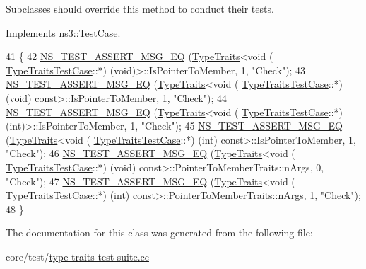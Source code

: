 Subclasses should override this method to conduct their tests. 

Implements \hyperlink{classns3_1_1TestCase_a8ff74680cf017ed42011e4be51917a24}{ns3\+::\+Test\+Case}.


\begin{DoxyCode}
41 \{
42   \hyperlink{group__testing_ga2a9d78cffb3db8e867c35fff0b698cf5}{NS\_TEST\_ASSERT\_MSG\_EQ} (\hyperlink{structTypeTraits}{TypeTraits}<\textcolor{keywordtype}{void} (
      \hyperlink{classTypeTraitsTestCase}{TypeTraitsTestCase}::*) (\textcolor{keywordtype}{void})>::IsPointerToMember, 1, \textcolor{stringliteral}{"Check"});
43   \hyperlink{group__testing_ga2a9d78cffb3db8e867c35fff0b698cf5}{NS\_TEST\_ASSERT\_MSG\_EQ} (\hyperlink{structTypeTraits}{TypeTraits}<\textcolor{keywordtype}{void} (
      \hyperlink{classTypeTraitsTestCase}{TypeTraitsTestCase}::*) (\textcolor{keywordtype}{void}) \textcolor{keyword}{const}>::IsPointerToMember, 1, \textcolor{stringliteral}{"Check"});
44   \hyperlink{group__testing_ga2a9d78cffb3db8e867c35fff0b698cf5}{NS\_TEST\_ASSERT\_MSG\_EQ} (\hyperlink{structTypeTraits}{TypeTraits}<\textcolor{keywordtype}{void} (
      \hyperlink{classTypeTraitsTestCase}{TypeTraitsTestCase}::*) (\textcolor{keywordtype}{int})>::IsPointerToMember, 1, \textcolor{stringliteral}{"Check"});
45   \hyperlink{group__testing_ga2a9d78cffb3db8e867c35fff0b698cf5}{NS\_TEST\_ASSERT\_MSG\_EQ} (\hyperlink{structTypeTraits}{TypeTraits}<\textcolor{keywordtype}{void} (
      \hyperlink{classTypeTraitsTestCase}{TypeTraitsTestCase}::*) (\textcolor{keywordtype}{int}) \textcolor{keyword}{const}>::IsPointerToMember, 1, \textcolor{stringliteral}{"Check"});
46   \hyperlink{group__testing_ga2a9d78cffb3db8e867c35fff0b698cf5}{NS\_TEST\_ASSERT\_MSG\_EQ} (\hyperlink{structTypeTraits}{TypeTraits}<\textcolor{keywordtype}{void} (
      \hyperlink{classTypeTraitsTestCase}{TypeTraitsTestCase}::*) (\textcolor{keywordtype}{void}) \textcolor{keyword}{const}>::PointerToMemberTraits::nArgs, 0, \textcolor{stringliteral}{"Check"});
47   \hyperlink{group__testing_ga2a9d78cffb3db8e867c35fff0b698cf5}{NS\_TEST\_ASSERT\_MSG\_EQ} (\hyperlink{structTypeTraits}{TypeTraits}<\textcolor{keywordtype}{void} (
      \hyperlink{classTypeTraitsTestCase}{TypeTraitsTestCase}::*) (\textcolor{keywordtype}{int}) \textcolor{keyword}{const}>::PointerToMemberTraits::nArgs, 1, \textcolor{stringliteral}{"Check"});
48 \}
\end{DoxyCode}


The documentation for this class was generated from the following file\+:\begin{DoxyCompactItemize}
\item 
core/test/\hyperlink{type-traits-test-suite_8cc}{type-\/traits-\/test-\/suite.\+cc}\end{DoxyCompactItemize}
